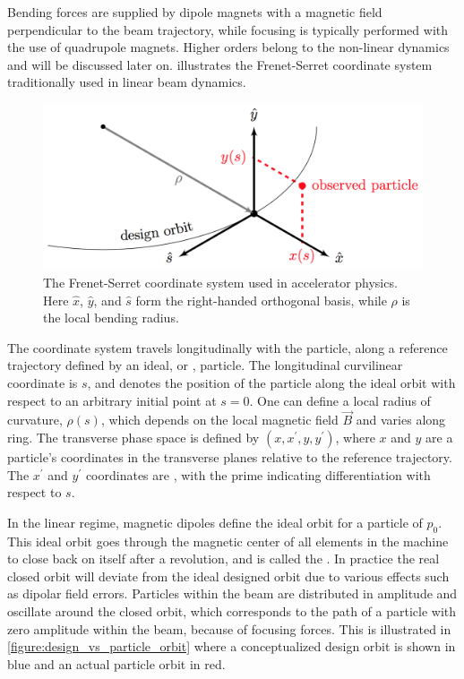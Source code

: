 Bending forces are supplied by dipole magnets with a magnetic field perpendicular to the beam trajectory, while focusing is typically performed with the use of quadrupole magnets.
Higher orders belong to the non-linear dynamics and will be discussed later on.
 illustrates the Frenet-Serret coordinate system traditionally used in linear beam dynamics.

\begin{figure}[!htb]
    \begin{center}
    \includegraphics[width = 0.8\linewidth]{Figures/Beam_Dynamics_Theory/Frenet_Serret_Coordinate_System.png}
    \caption{The Frenet-Serret coordinate system used in accelerator physics. Here \(\hat{x}\), \(\hat{y}\), and \(\hat{s}\) form the right-handed orthogonal basis, while \(\rho\) is the local bending radius.}
    \label{figure:frenet_serret_system}
    \end{center}
\end{figure}

The coordinate system travels longitudinally with the particle, along a reference trajectory defined by an ideal, or , particle.
The longitudinal curvilinear coordinate is \(s\), and denotes the position of the particle along the ideal orbit with respect to an arbitrary initial point at \(s = 0\).
One can define a local radius of curvature, \(\rho(s)\), which depends on the local magnetic field \(\vec{B}\) and varies along ring.
The transverse phase space is defined by \((x, x^{\prime}, y, y^{\prime})\), where \(x\) and \(y\) are a particle's coordinates in the transverse planes relative to the reference trajectory.
The \(x^{\prime}\) and \(y^{\prime}\) coordinates are , with the prime indicating differentiation with respect to \(s\).
\break

In the linear regime, magnetic dipoles define the ideal orbit for a particle of  \(p_0\).
This ideal orbit goes through the magnetic center of all elements in the machine to close back on itself after a revolution, and is called the .
In practice the real closed orbit will deviate from the ideal designed orbit due to various effects such as dipolar field errors.
Particles within the beam are distributed in amplitude and oscillate around the closed orbit, which corresponds to the path of a particle with zero amplitude within the beam, because of focusing forces. 
This is illustrated in \cref{figure:design_vs_particle_orbit} where a conceptualized design orbit is shown in blue and an actual particle orbit in red.

